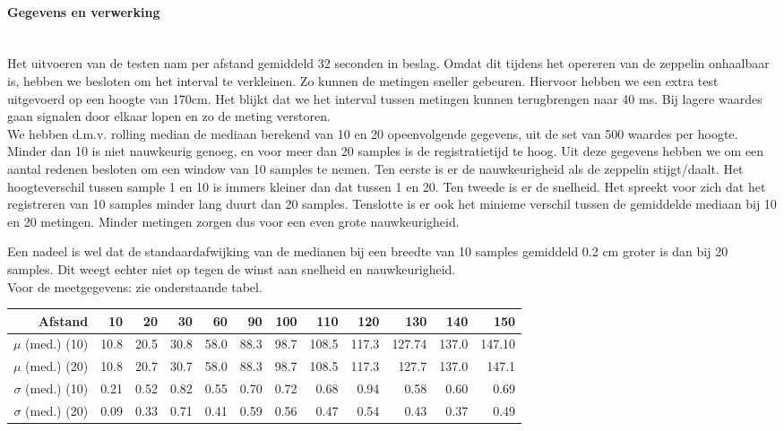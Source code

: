\documentclass[eind]{penoverslag}
\begin{document}
\paragraph{Gegevens en verwerking} ~\\ 
Het uitvoeren van de testen nam per afstand gemiddeld 32 seconden in beslag. Omdat dit tijdens het opereren van de zeppelin onhaalbaar is, hebben we besloten om het interval te verkleinen. Zo kunnen de metingen sneller gebeuren. Hiervoor hebben we een extra test uitgevoerd op een hoogte van 170cm. Het blijkt dat we het interval tussen metingen kunnen terugbrengen naar 40 ms. Bij lagere waardes gaan signalen door elkaar lopen en zo de meting verstoren. \\

We hebben d.m.v. rolling median de mediaan berekend van 10 en 20 opeenvolgende gegevens, uit de set van 500 waardes per hoogte. Minder dan 10 is niet nauwkeurig genoeg, en voor meer dan 20 samples is de registratietijd te hoog. Uit deze gegevens hebben we om een aantal redenen besloten om een window van 10 samples te nemen.  Ten eerste is er de nauwkeurigheid als de zeppelin stijgt/daalt. Het hoogteverschil tussen sample 1 en 10 is immers kleiner dan dat tussen 1 en 20. Ten tweede is er de snelheid. Het spreekt voor zich dat het registreren van 10 samples minder lang duurt dan 20 samples. Tenslotte is er ook het minieme verschil tussen de gemiddelde mediaan bij 10 en 20 metingen. Minder metingen zorgen dus voor een even grote nauwkeurigheid. 

Een nadeel is wel dat de standaardafwijking van de medianen bij een breedte van 10 samples gemiddeld 0.2 cm groter is dan bij 20 samples. Dit weegt echter niet op tegen de winst aan snelheid en nauwkeurigheid.\\ 

Voor de meetgegevens: zie onderstaande tabel. \\

\begin{tabular}{r||r|r|r|r|r|r|r|r|r|r|r}
\textbf{Afstand} & 10 & 20 & 30 & 60 & 90 & 100 & 110 & 120 & 130 & 140 & 150 \\
\hline \hline 
$\mu$ (med.) (10) & 10.8 & 20.5 & 30.8 & 58.0 & 88.3 & 98.7 & 108.5 & 117.3 & 127.74 & 137.0 & 147.10 \\
$\mu$ (med.) (20) & 10.8 & 20.7 & 30.7 & 58.0 & 88.3 & 98.7 & 108.5 & 117.3 & 127.7 & 137.0 & 147.1 \\
$\sigma$ (med.) (10) & 0.21 & 0.52 & 0.82 & 0.55 & 0.70 & 0.72 & 0.68 & 0.94 & 0.58 & 0.60 & 0.69 \\
$\sigma$ (med.) (20)& 0.09 & 0.33 & 0.71 & 0.41 & 0.59 & 0.56 & 0.47 & 0.54 & 0.43 & 0.37 & 0.49 \\
\end{tabular}
\end{document}
